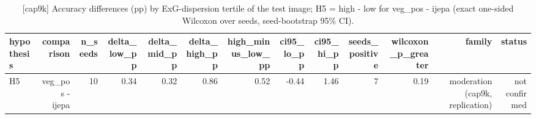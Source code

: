 \begin{table}[t]
\centering
\small
\caption{[cap9k] Accuracy differences (pp) by ExG-dispersion tertile of the test image; H5 = high - low for veg\_pos - ijepa (exact one-sided Wilcoxon over seeds, seed-bootstrap 95\% CI).}
\label{tab:moderation}
\begin{tabular}{lrrrrrrrrrrrr}
\toprule
hypothesis & comparison & n\_seeds & delta\_low\_pp & delta\_mid\_pp & delta\_high\_pp & high\_minus\_low\_pp & ci95\_lo\_pp & ci95\_hi\_pp & seeds\_positive & wilcoxon\_p\_greater & family & status \\
\midrule
H5 & veg\_pos - ijepa & 10 & 0.34 & 0.32 & 0.86 & 0.52 & -0.44 & 1.46 & 7 & 0.19 & moderation (cap9k, replication) & not confirmed \\
\bottomrule
\end{tabular}
\end{table}
